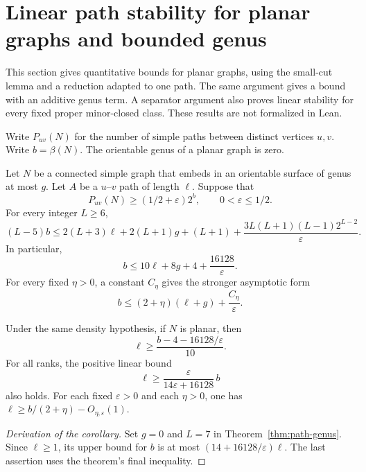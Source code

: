 \section{Linear path stability for planar graphs and bounded genus}
\label{sec:path-phase-two}

This section gives quantitative bounds for planar graphs, using the small-cut lemma and a reduction adapted to one path.
The same argument gives a bound with an additive genus term.
A separator argument also proves linear stability for every fixed proper minor-closed class.
These results are not formalized in Lean.

Write $P_{uv}(N)$ for the number of simple paths between distinct vertices $u,v$.
Write $b=\beta(N)$.
The orientable genus of a planar graph is zero.

\begin{theorem}
\label{thm:path-genus}
Let $N$ be a connected simple graph that embeds in an orientable surface of genus at most $g$.
Let $A$ be a $u$--$v$ path of length $\ell$.
Suppose that
\[
 P_{uv}(N)\ge(1/2+\varepsilon)2^b,
 \qquad 0<\varepsilon\le1/2.
\]
For every integer $L\ge6$,
\begin{equation}\label{eq:path-genus-explicit}
 (L-5)b
 \le 2(L+3)\ell+2(L+1)g+(L+1)
 +\frac{3L(L+1)(L-1)2^{L-2}}{\varepsilon}.
\end{equation}
In particular,
\[
 b\le10\ell+8g+4+\frac{16128}{\varepsilon}.
\]
For every fixed $\eta>0$, a constant $C_\eta$ gives the stronger asymptotic form
\[
 b\le(2+\eta)(\ell+g)+\frac{C_\eta}{\varepsilon}.
\]
\end{theorem}

\begin{corollary}
\label{cor:path-planar}
Under the same density hypothesis, if $N$ is planar, then
\[
 \ell\ge\frac{b-4-16128/\varepsilon}{10}.
\]
For all ranks, the positive linear bound
\[
 \ell\ge\frac{\varepsilon}{14\varepsilon+16128}\,b
\]
also holds.
For each fixed $\varepsilon>0$ and each $\eta>0$, one has
$\ell\ge b/(2+\eta)-O_{\eta,\varepsilon}(1)$.
\end{corollary}

\begin{proof}[Derivation of the corollary]
Set $g=0$ and $L=7$ in Theorem~\ref{thm:path-genus}.
Since $\ell\ge1$, its upper bound for $b$ is at most
$(14+16128/\varepsilon)\ell$.
The last assertion uses the theorem's final inequality.
\end{proof}

